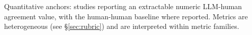 \begin{table}[tbp]\centering\footnotesize
\caption{Quantitative anchors: studies reporting an extractable numeric LLM-human agreement value, with the
human-human baseline where reported. Metrics are heterogeneous (see \S\ref{sec:rubric}) and are interpreted
within metric families.}
\label{tab:anchors}

\end{table}